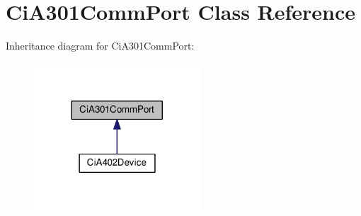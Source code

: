 \hypertarget{classCiA301CommPort}{}\section{Ci\+A301\+Comm\+Port Class Reference}
\label{classCiA301CommPort}


Inheritance diagram for Ci\+A301\+Comm\+Port\+:
\nopagebreak
\begin{figure}[H]
\begin{center}
\leavevmode
\includegraphics[width=176pt]{classCiA301CommPort__inherit__graph}
\end{center}
\end{figure}
